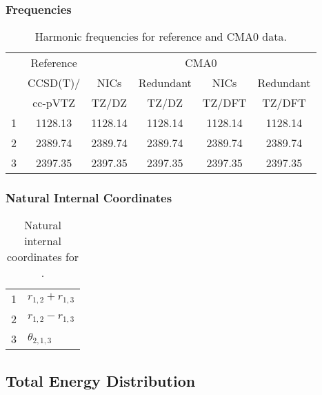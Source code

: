 \documentclass[10pt,oneside]{article}
\begin{document}
\begin{table}[h!]
\subsubsection*{Frequencies}
\centering
\caption{Harmonic frequencies for reference and CMA0 data.}
\begin{tabular}{cccccc}
\toprule
{} & Reference & \multicolumn{4}{c}{CMA0} \\
{} &  CCSD(T)/ &    NICs &  Redundant &    NICs & Redundant \\
{} &   cc-pVTZ &   TZ/DZ &      TZ/DZ &  TZ/DFT &    TZ/DFT \\
\midrule
1 &   1128.13 & 1128.14 &    1128.14 & 1128.14 &   1128.14 \\
2 &   2389.74 & 2389.74 &    2389.74 & 2389.74 &   2389.74 \\
3 &   2397.35 & 2397.35 &    2397.35 & 2397.35 &   2397.35 \\
\bottomrule
\end{tabular}
\end{table}

\begin{table}[h!]
\subsubsection*{Natural Internal Coordinates}
\centering
\caption{Natural internal coordinates for .}
\small
\begin{tabular}{ll}
\toprule
  1   & $r_{1,2} + r_{1,3}$ \\
  2   & $r_{1,2} - r_{1,3}$ \\
  3   & $\theta_{2,1,3}$ \\
\bottomrule
\end{tabular}
\end{table}

\begin{table}
\subsection*{Total Energy Distribution}
\centering\end{table}

\clearpage

\subsection{}
\end{document}
